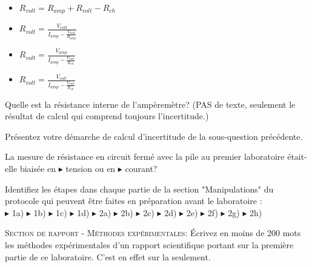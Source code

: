 \documentclass[canadien,12pt,oneside,letterpaper]{article}
\begin{document}
\begin{gradescope}
\begin{gradescope}
\begin{itemize}[label=$\blacktriangleright$]
    \item $R_{volt}=R_{amp}+R_{volt}-R_{ch}$
    \item $R_{volt} = \frac{V_{volt}}{I_{amp}-\frac{V_{volt}}{R_{amp}}}$
    \item $R_{volt} = \frac{V_{amp}}{I_{amp}-\frac{V_{volt}}{R_{ch}}}$
    \item $R_{volt} = \frac{V_{volt}}{I_{amp}-\frac{V_{volt}}{R_{ch}}}$
    \end{itemize}
    \item Quelle est la résistance interne de l'ampèremètre? (PAS de texte, seulement le résultat de calcul qui comprend toujours l'incertitude.)
    \item Présentez votre démarche de calcul d'incertitude de la sous-question précédente. %
    \end{gradescope}
\item La mesure de résistance en circuit fermé avec la pile au premier laboratoire était-elle biaisée en $\blacktriangleright$ tension ou en $\blacktriangleright$ courant?
\item Identifiez les étapes dans chaque partie de la section "Manipulations" du protocole qui peuvent être faites en préparation avant le laboratoire :\\ $\blacktriangleright$ 1a) $\blacktriangleright$ 1b) $\blacktriangleright$ 1c) $\blacktriangleright$ 1d) $\blacktriangleright$ 2a) $\blacktriangleright$ 2b) $\blacktriangleright$ 2c) $\blacktriangleright$ 2d) $\blacktriangleright$ 2e) $\blacktriangleright$ 2f) $\blacktriangleright$ 2g) $\blacktriangleright$ 2h) 
\item \textsc{Section de rapport - Méthodes expérimentales:} Écrivez en moins de 200 mots les méthodes expérimentales d'un rapport scientifique portant sur la première partie de ce laboratoire. C'est en effet sur la  seulement.
\end{gradescope}
\end{document}

